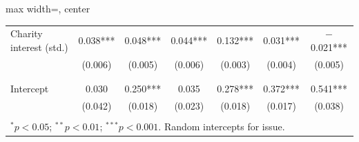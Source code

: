 \begin{table}[htbp]
\begin{adjustbox}{max width=\linewidth, center}
\begin{tabular}{lcccccc}
\addlinespace
Charity interest (std.) & 0.038*** & 0.048*** & 0.044*** & 0.132*** & 0.031*** & $-$0.021*** \\
 & (0.006) & (0.005) & (0.006) & (0.003) & (0.004) & (0.005) \\
\addlinespace
\cellcolor{gray!15}{Bonus amount (\pounds)} & \cellcolor{gray!15}{} & \cellcolor{gray!15}{} & \cellcolor{gray!15}{} & \cellcolor{gray!15}{$-$0.031***} & \cellcolor{gray!15}{} & \cellcolor{gray!15}{} \\
\cellcolor{gray!15}{} & \cellcolor{gray!15}{} & \cellcolor{gray!15}{} & \cellcolor{gray!15}{} & \cellcolor{gray!15}{(0.002)} & \cellcolor{gray!15}{} & \cellcolor{gray!15}{} \\
\addlinespace
Intercept & 0.030 & 0.250*** & 0.035 & 0.278*** & 0.372*** & 0.541*** \\
 & (0.042) & (0.018) & (0.023) & (0.018) & (0.017) & (0.038) \\
\addlinespace
\midrule
\cellcolor{gray!15}{$N$} & \cellcolor{gray!15}{8,000} & \cellcolor{gray!15}{8,000} & \cellcolor{gray!15}{8,000} & \cellcolor{gray!15}{8,000} & \cellcolor{gray!15}{8,000} & \cellcolor{gray!15}{8,000} \\
\bottomrule
\multicolumn{7}{l}{\footnotesize $^{*}p<0.05$; $^{**}p<0.01$; $^{***}p<0.001$. Random intercepts for issue.} \\
\end{tabular}
\endgroup{}
\end{adjustbox}
\end{table}
